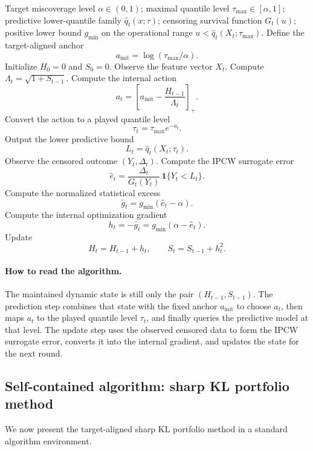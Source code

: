 \documentclass[11pt]{article}
\newcommand{\1}{\mathbf{1}}
\begin{document}
\begin{algorithm}[ht]
\caption{Survival AdaFTRL}
\begin{algorithmic}[1]
\Require Target miscoverage level $\alpha\in(0,1)$; maximal quantile level $\tau_{\max}\in[\alpha,1]$; predictive lower-quantile family $\hat q_t(x;\tau)$; censoring survival function $G_t(u)$; positive lower bound $g_{\min}$ on the operational range $u<\hat q_t(X_t;\tau_{\max})$.
\State Define the target-aligned anchor
\[
a_{\mathrm{init}}=\log(\tau_{\max}/\alpha).
\]
\State Initialize $H_0=0$ and $S_0=0$.
  \State Observe the feature vector $X_t$.
  \State Compute $\Lambda_t=\sqrt{1+S_{t-1}}$.
  \State Compute the internal action
  \[
  a_t=\left[a_{\mathrm{init}}-\frac{H_{t-1}}{\Lambda_t}\right]_+.
  \]
  \State Convert the action to a played quantile level
  \[
  \tau_t=\tau_{\max}e^{-a_t}.
  \]
  \State Output the lower predictive bound
  \[
  L_t=\hat q_t(X_t;\tau_t).
  \]
  \State Observe the censored outcome $(Y_t,\Delta_t)$.
  \State Compute the IPCW surrogate error
  \[
  \hat e_t=\frac{\Delta_t}{G_t(Y_t)}\,\1\{Y_t< L_t\}.
  \]
  \State Compute the normalized statistical excess
  \[
  \bar g_t=g_{\min}(\hat e_t-\alpha).
  \]
  \State Compute the internal optimization gradient
  \[
  h_t=-\bar g_t=g_{\min}(\alpha-\hat e_t).
  \]
  \State Update
  \[
  H_t=H_{t-1}+h_t,
  \qquad
  S_t=S_{t-1}+h_t^2.
  \]
\EndFor
\end{algorithmic}
\end{algorithm}

\paragraph{How to read the algorithm.}
The maintained dynamic state is still only the pair $(H_{t-1},S_{t-1})$. The prediction step combines that state with the fixed anchor \(a_{\mathrm{init}}\) to choose \(a_t\), then maps \(a_t\) to the played quantile level \(\tau_t\), and finally queries the predictive model at that level. The update step uses the observed censored data to form the IPCW surrogate error, converts it into the internal gradient, and updates the state for the next round.



\subsection{Self-contained algorithm: sharp KL portfolio method}

We now present the target-aligned sharp KL portfolio method in a standard algorithm environment.
\end{document}
